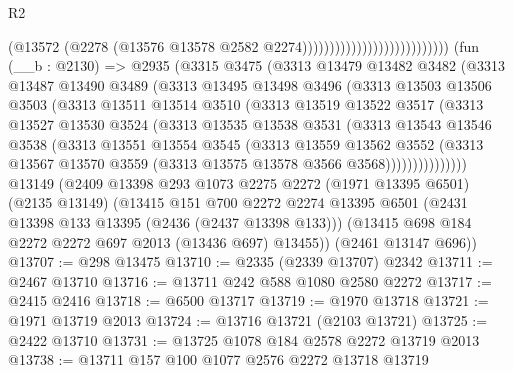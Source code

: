 \begin{lexlean}{R2}
\begin{coremodule}
                                                    (@13572
                                                      (@2278
                                                        (@13576
                                                          @13578
                                                          @2582
                                                          @2274)))))))))))))))))))))))))))
    (fun (__b : @2130) =>
    @2935
      (@3315
        @3475
        (@3313
          @13479
          @13482
          @3482
          (@3313
            @13487
            @13490
            @3489
            (@3313
              @13495
              @13498
              @3496
              (@3313
                @13503
                @13506
                @3503
                (@3313
                  @13511
                  @13514
                  @3510
                  (@3313
                    @13519
                    @13522
                    @3517
                    (@3313
                      @13527
                      @13530
                      @3524
                      (@3313
                        @13535
                        @13538
                        @3531
                        (@3313
                          @13543
                          @13546
                          @3538
                          (@3313
                            @13551
                            @13554
                            @3545
                            (@3313
                              @13559
                              @13562
                              @3552
                              (@3313
                                @13567
                                @13570
                                @3559
                                (@3313 @13575 @13578 @3566 @3568)))))))))))))))
    @13149
    (@2409
      @13398
      @293
      @1073
      @2275
      @2272
      (@1971 @13395 @6501)
      (@2135 @13149)
      (@13415
        @151
        @700
        @2272
        @2274
        @13395
        @6501
        (@2431 @13398 @133 @13395 (@2436 (@2437 @13398 @133)))
        (@13415 @698 @184 @2272 @2272 @697 @2013 (@13436 @697) @13455))
      (@2461 @13147 @696))
@13707 := @298 @13475
@13710 := @2335 (@2339 @13707) @2342
@13711 := @2467 @13710
@13716 := @13711 @242 @588 @1080 @2580 @2272
@13717 := @2415 @2416
@13718 := @6500 @13717
@13719 := @1970 @13718
@13721 := @1971 @13719 @2013
@13724 := @13716 @13721 (@2103 @13721)
@13725 := @2422 @13710
@13731 := @13725 @1078 @184 @2578 @2272 @13719 @2013
@13738 := @13711 @157 @100 @1077 @2576 @2272 @13718 @13719

\end{coremodule}
\end{lexlean}
